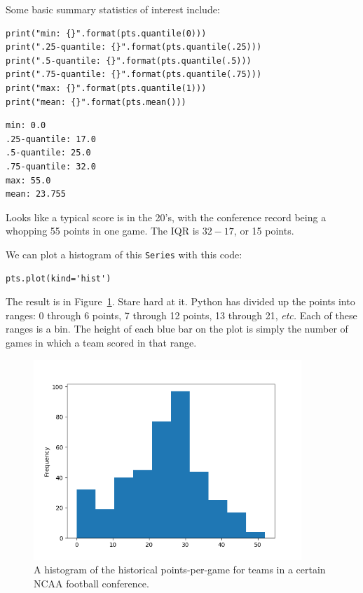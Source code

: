 Some basic summary statistics of interest include:

\begin{Verbatim}[fontsize=\small,samepage=true,frame=single,framesep=3mm]
print("min: {}".format(pts.quantile(0)))
print(".25-quantile: {}".format(pts.quantile(.25)))
print(".5-quantile: {}".format(pts.quantile(.5)))
print(".75-quantile: {}".format(pts.quantile(.75)))
print("max: {}".format(pts.quantile(1)))
print("mean: {}".format(pts.mean()))
\end{Verbatim}
\vspace{-.2in}

\label{ncaaQuantiles}
\begin{Verbatim}[fontsize=\small,samepage=true,frame=leftline,framesep=5mm,framerule=1mm]
min: 0.0
.25-quantile: 17.0
.5-quantile: 25.0
.75-quantile: 32.0
max: 55.0
mean: 23.755
\end{Verbatim}

Looks like a typical score is in the 20's, with the conference record being a
whopping 55 points in one game. The IQR is $32-17$, or 15 points.

We can plot a histogram of this \texttt{Series} with this code:

\begin{Verbatim}[fontsize=\small,samepage=true,frame=single,framesep=3mm]
pts.plot(kind='hist')
\end{Verbatim}

The result is in Figure~\ref{fig:ncaa1}. Stare hard at it. Python has divided
up the points into ranges: 0 through 6 points, 7 through 12 points, 13 through
21, \textit{etc.} Each of these ranges is a bin. The height of each blue bar on
the plot is simply the number of games in which a team scored in that range.

\begin{figure}[ht]
\centering
\includegraphics[width=0.9\textwidth]{ncaa1.png}
\caption{A histogram of the historical points-per-game for teams in a certain
NCAA football conference.}
\label{fig:ncaa1}
\end{figure}

